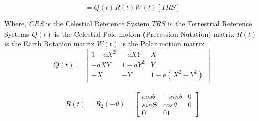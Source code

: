 \begin{equation}
    [CRS] = Q(t)R(t)W(t)[TRS]
\end{equation}

Where,
$CRS$ is the Celestial Reference System
$TRS$ is the Terrestrial Reference Systems
$Q(t)$ is the Celestial Pole motion (Precession-Nutation) matrix
$R(t)$ is the Earth Rotation matrix
$W(t)$ is the Polar motion matrix
\\
\begin{equation}
Q(t) = 
\begin{bmatrix} 
1-aX^2  & -aXY     & X \\
 -aXY   & 1 - aY^2 & Y \\
 -X     & -Y       & 1-a(X^2+Y^2) 
\end{bmatrix}
\end{equation}
\\
\begin{equation}
R(t) = R_2(-\theta) = 
\begin{bmatrix}
cos \theta & -sin \theta & 0 \\
sin \Theta & cos \theta  & 0 \\
0 & 0 1
\end{bmatrix}
\end{equation}



